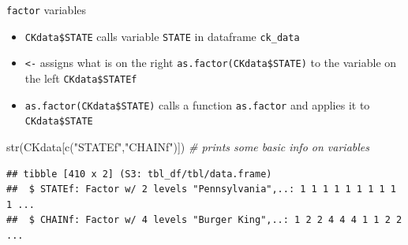 \documentclass[
  ignorenonframetext,
]{beamer}
\newenvironment{Shaded}{\begin{snugshade}}{\end{snugshade}}
\newcommand{\CommentTok}[1]{\textcolor[rgb]{0.56,0.35,0.01}{\textit{#1}}}
\newcommand{\FunctionTok}[1]{\textcolor[rgb]{0.00,0.00,0.00}{#1}}
\newcommand{\NormalTok}[1]{#1}
\newcommand{\OtherTok}[1]{\textcolor[rgb]{0.56,0.35,0.01}{#1}}
\newcommand{\SpecialCharTok}[1]{\textcolor[rgb]{0.00,0.00,0.00}{#1}}
\newcommand{\StringTok}[1]{\textcolor[rgb]{0.31,0.60,0.02}{#1}}
\begin{document}
\begin{frame}[fragile]{\texttt{factor} variables}
\protect\hypertarget{variables-1}{}
\footnotesize

\begin{Shaded}
\end{Shaded}

\normalsize

\begin{itemize}
  \item \texttt{CKdata\$STATE} calls variable \texttt{STATE} in dataframe \texttt{ck\_data}
  \item \texttt{<-} assigns what is on the right \texttt{as.factor(CKdata\$STATE)} to the variable on the left \texttt{CKdata\$STATEf}
  \item \texttt{as.factor(CKdata\$STATE)} calls a function \texttt{as.factor} and applies it to \texttt{CKdata\$STATE}
\end{itemize}

\footnotesize

\begin{Shaded}
\begin{Highlighting}[]
\FunctionTok{str}\NormalTok{(CKdata[}\FunctionTok{c}\NormalTok{(}\StringTok{"STATEf"}\NormalTok{,}\StringTok{"CHAINf"}\NormalTok{)])  }\CommentTok{\# prints some basic info on variables}
\end{Highlighting}
\end{Shaded}

\begin{verbatim}
## tibble [410 x 2] (S3: tbl_df/tbl/data.frame)
##  $ STATEf: Factor w/ 2 levels "Pennsylvania",..: 1 1 1 1 1 1 1 1 1 1 ...
##  $ CHAINf: Factor w/ 4 levels "Burger King",..: 1 2 2 4 4 4 1 1 2 2 ...
\end{verbatim}

\normalsize
\end{frame}
\end{document}
